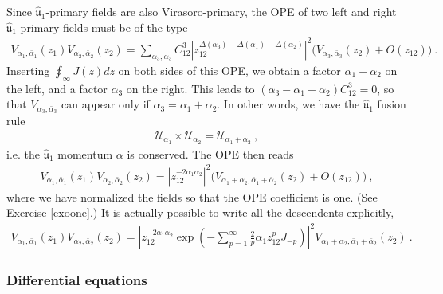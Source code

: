 \documentclass[12pt, a4paper, notitlepage, twoside]{report}
\numberwithin{equation}{section}
\theoremstyle{break}
\begin{document}
Since $\hat{\mathfrak{u}}_1$-primary fields are also Virasoro-primary, the OPE of two left and right 
$\hat{\mathfrak{u}}_1$-primary fields must be of the type 
\begin{align}
 V_{\alpha_1,\bar\alpha_1}(z_1) V_{\alpha_2,\bar\alpha_2}(z_2) = \sum_{\alpha_3,\bar\alpha_3} C_{12}^3 \left| z_{12}^{\Delta(\alpha_3)-\Delta(\alpha_1)-\Delta(\alpha_2)}\right|^2 \Big(V_{\alpha_3,\bar\alpha_3}(z_2) + O(z_{12}) \Big)\ .
\end{align}
Inserting $\oint_\infty J(z)dz$ on both sides of this OPE, we obtain a factor $\alpha_1+\alpha_2$ on the left, and a factor $\alpha_3$ on the right.
This leads to $(\alpha_3-\alpha_1-\alpha_2)C_{12}^3=0$, so that $V_{\alpha_3,\bar\alpha_3}$ can appear only if $\alpha_3=\alpha_1+\alpha_2$. 
In other words, we have the $\hat{\mathfrak{u}}_1$ fusion rule
\begin{align}
 \boxed{\mathcal{U}_{\alpha_1}\times \mathcal{U}_{\alpha_2} = \mathcal{U}_{\alpha_1+\alpha_2}}\ ,
\label{vvp}
\end{align}
i.e. the $\hat{\mathfrak{u}}_1$ momentum $\alpha$ is conserved.
The OPE then reads 
\begin{align}
\boxed{V_{\alpha_1,\bar\alpha_1}(z_1)V_{\alpha_2,\bar\alpha_2}(z_2) 
= 
\left| z_{12}^{-2\alpha_1\alpha_2}\right|^2 \big( V_{\alpha_1+\alpha_2,\bar\alpha_1+\bar\alpha_2}(z_2) + O(z_{12})\big)}\ ,
\label{vvoo}
\end{align}
where we have normalized the fields so that the OPE coefficient is one. (See Exercise \ref{exoone}.)
It is actually possible to write all the descendents explicitly,
\begin{align}
 V_{\alpha_1,\bar\alpha_1}(z_1)V_{\alpha_2,\bar\alpha_2}(z_2) 
= 
\left| z_{12}^{-2\alpha_1\alpha_2} \exp\left(-\sum_{p=1}^\infty \frac{2}{p}\alpha_1 z_{12}^pJ_{-p} \right)\right|^2 V_{\alpha_1+\alpha_2,\bar\alpha_1+\bar\alpha_2}(z_2) \ .
\end{align}

\subsubsection{Differential equations}
\end{document}

